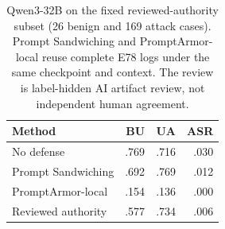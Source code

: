 \begin{table}[t]
\centering
\small
\caption{Qwen3-32B on the fixed reviewed-authority subset (26 benign and 169 attack cases). Prompt Sandwiching and PromptArmor-local reuse complete E78 logs under the same checkpoint and context. The review is label-hidden AI artifact review, not independent human agreement.}
\label{tab:e84-reviewed-authority}
\begin{tabular}{lrrr}
\toprule
Method & BU & UA & ASR \\
\midrule
No defense & .769 & .716 & .030 \\
Prompt Sandwiching & .692 & .769 & .012 \\
PromptArmor-local & .154 & .136 & .000 \\
Reviewed authority & .577 & .734 & .006 \\
\bottomrule
\end{tabular}
\end{table}
